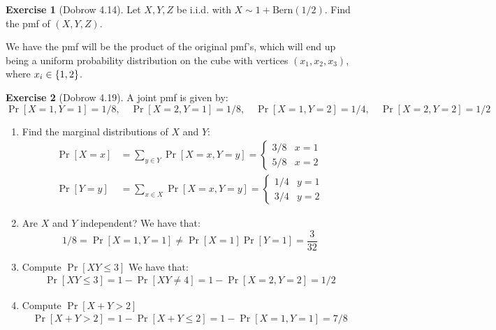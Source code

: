 \documentclass{article}
\theoremstyle{definition}
\newtheorem{exercise}{Exercise}[section]
\begin{document}
\begin{exercise}[Dobrow 4.14]
Let $X,Y,Z$ be i.i.d. with $X\sim 1 + \text{Bern}(1/2)$.
Find the pmf of $(X,Y,Z)$.

We have the pmf will be the product of the original pmf's, which will end up being a uniform probability distribution on the cube with vertices $(x_1,x_2,x_3)$, where $x_i\in\Bqty{1,2}$.
\end{exercise}
\begin{exercise}[Dobrow 4.19]
A joint pmf is given by:
\begin{equation}
\Pr[X = 1,Y = 1] = 1/8,\quad \Pr[X = 2, Y= 1] = 1/8,\quad\Pr[X = 1,Y = 2] = 1/4,\quad\Pr[X = 2, Y = 2] = 1/2
\end{equation}
\begin{enumerate}
\item Find the marginal distributions of $X$ and $Y$:
\begin{align*}
\Pr[X = x] & = \sum_{y\in Y} \Pr[X = x,Y = y] = \begin{cases}
3/8& x = 1 \\
5/8& x = 2
\end{cases} \\
\Pr[Y = y] & = \sum_{x\in X}\Pr[X =x, Y = y] = \begin{cases}
1/4 & y = 1 \\
3/4 & y = 2
\end{cases}
\end{align*}
\item Are $X$ and $Y$ independent?
We have that:
\begin{equation}
1/8 = \Pr[X = 1, Y = 1] \neq \Pr[X = 1]\Pr[Y = 1] = \frac{3}{32}
\end{equation}
\item Compute $\Pr[XY\leq 3]$
We have that:
\begin{align*}
\Pr[XY\leq 3] = 1 - \Pr[XY\neq 4] = 1 - \Pr[X = 2,Y = 2] = 1/2
\end{align*}
\item Compute $\Pr[X+Y > 2]$
\begin{align*}
\Pr[X+Y > 2] = 1 - \Pr[X+Y \leq 2] = 1 - \Pr[X = 1,Y = 1] = 7/8
\end{align*}
\end{enumerate}
\end{exercise}
\end{document}

